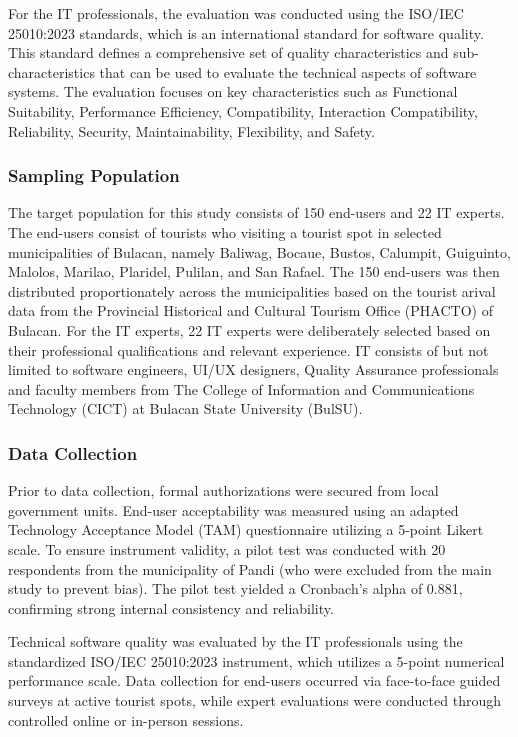 For the IT professionals, the evaluation was conducted using the ISO/IEC 25010:2023 standards, which is an international standard for software quality. This standard defines a comprehensive set of quality characteristics and sub-characteristics that can be used to evaluate the technical aspects of software systems. The evaluation focuses on key characteristics such as Functional Suitability, Performance Efficiency, Compatibility, Interaction Compatibility, Reliability, Security, Maintainability, Flexibility, and Safety.

\subsubsection{Sampling Population}

The target population for this study consists of 150 end-users and 22 IT experts. The end-users consist of tourists who visiting a tourist spot in selected municipalities of Bulacan, namely Baliwag, Bocaue, Bustos, Calumpit, Guiguinto, Malolos, Marilao, Plaridel, Pulilan, and San Rafael. The 150 end-users was then distributed proportionately across the municipalities based on the tourist arival data from the Provincial Historical and Cultural Tourism Office (PHACTO) of Bulacan. For the IT experts, 22 IT experts were deliberately selected based on their professional qualifications and relevant experience. IT consists of but not limited to software engineers, UI/UX designers, Quality Assurance professionals and faculty members from The College of Information and Communications Technology (CICT) at Bulacan State University (BulSU).

\subsubsection{Data Collection}
Prior to data collection, formal authorizations were secured from local government units. End-user acceptability was measured using an adapted Technology Acceptance Model (TAM) questionnaire utilizing a 5-point Likert scale. To ensure instrument validity, a pilot test was conducted with 20 respondents from the municipality of Pandi (who were excluded from the main study to prevent bias). The pilot test yielded a Cronbach’s alpha of 0.881, confirming strong internal consistency and reliability. 

Technical software quality was evaluated by the IT professionals using the standardized ISO/IEC 25010:2023 instrument, which utilizes a 5-point numerical performance scale. Data collection for end-users occurred via face-to-face guided surveys at active tourist spots, while expert evaluations were conducted through controlled online or in-person sessions.


